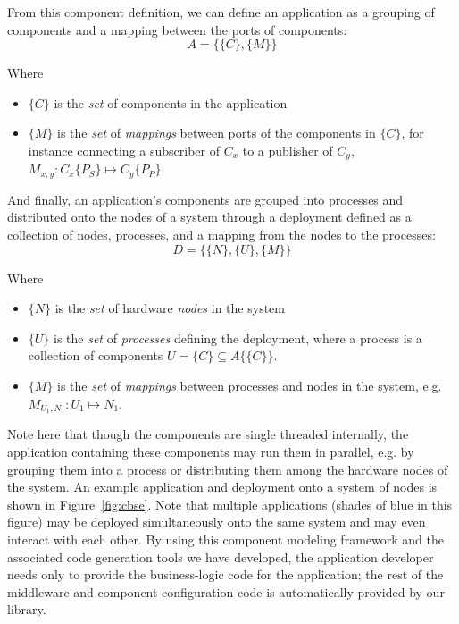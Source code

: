 From this component definition, we can define an application as a
grouping of components and a mapping between the ports of components:
\begin{equation}
  A = \{\{C\},\{M\}\}
\end{equation}

Where

\begin{itemize}
\item $\{C\}$ is the \emph{set} of components in the application
\item $\{M\}$ is the \emph{set} of \emph{mappings} between ports of
  the components in $\{C\}$, for instance connecting a subscriber of
  $C_x$ to a publisher of $C_y$, $M_{x,y} : C_x\{P_S\}\mapsto
  C_y\{P_P\}$.
\end{itemize}

And finally, an application's components are grouped into processes
and distributed onto the nodes of a system through a deployment
defined as a collection of nodes, processes, and a mapping from the
nodes to the processes:
\begin{equation}
  D = \{\{N\},\{U\},\{M\}\}
\end{equation}

Where

\begin{itemize}
\item $\{N\}$ is the \emph{set} of hardware \emph{nodes} in the system
\item $\{U\}$ is the \emph{set} of \emph{processes} defining the deployment,
  where a process is a collection of components
  $U=\{C\}\subseteq A\{\{C\}\}$.
\item $\{M\}$ is the \emph{set} of \emph{mappings} between processes and nodes
  in the system, e.g. $M_{U_1,N_1} : U_1\mapsto N_1$.
\end{itemize}

Note here that though the components are single threaded internally,
the application containing these components may run them in parallel,
e.g. by grouping them into a process or distributing them among the
hardware nodes of the system.  An example application and deployment
onto a system of nodes is shown in Figure~\ref{fig:cbse}.  Note that
multiple applications (shades of blue in this figure) may be deployed
simultaneously onto the same system and may even interact with each
other.  By using this component modeling framework and the associated
code generation tools we have developed, the application developer
needs only to provide the business-logic code for the application; the
rest of the middleware and component configuration code is
automatically provided by our library.

